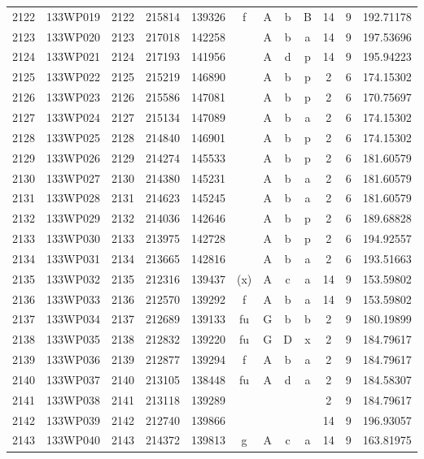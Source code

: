 \begin{tabular}{|*{12}{c|}}
2122 & 133WP019 & 2122 & 215814 & 139326 & f & A & b & B & 14 & 9 & 192.71178 \\ 
2123 & 133WP020 & 2123 & 217018 & 142258 &  & A & b & a & 14 & 9 & 197.53696 \\ 
2124 & 133WP021 & 2124 & 217193 & 141956 &  & A & d & p & 14 & 9 & 195.94223 \\ 
2125 & 133WP022 & 2125 & 215219 & 146890 &  & A & b & p & 2 & 6 & 174.15302 \\ 
2126 & 133WP023 & 2126 & 215586 & 147081 &  & A & b & p & 2 & 6 & 170.75697 \\ 
2127 & 133WP024 & 2127 & 215134 & 147089 &  & A & b & a & 2 & 6 & 174.15302 \\ 
2128 & 133WP025 & 2128 & 214840 & 146901 &  & A & b & p & 2 & 6 & 174.15302 \\ 
2129 & 133WP026 & 2129 & 214274 & 145533 &  & A & b & p & 2 & 6 & 181.60579 \\ 
2130 & 133WP027 & 2130 & 214380 & 145231 &  & A & b & a & 2 & 6 & 181.60579 \\ 
2131 & 133WP028 & 2131 & 214623 & 145245 &  & A & b & a & 2 & 6 & 181.60579 \\ 
2132 & 133WP029 & 2132 & 214036 & 142646 &  & A & b & p & 2 & 6 & 189.68828 \\ 
2133 & 133WP030 & 2133 & 213975 & 142728 &  & A & b & p & 2 & 6 & 194.92557 \\ 
2134 & 133WP031 & 2134 & 213665 & 142816 &  & A & b & a & 2 & 6 & 193.51663 \\ 
2135 & 133WP032 & 2135 & 212316 & 139437 & (x) & A & c & a & 14 & 9 & 153.59802 \\ 
2136 & 133WP033 & 2136 & 212570 & 139292 & f & A & b & a & 14 & 9 & 153.59802 \\ 
2137 & 133WP034 & 2137 & 212689 & 139133 & fu & G & b & b & 2 & 9 & 180.19899 \\ 
2138 & 133WP035 & 2138 & 212832 & 139220 & fu & G & D & x & 2 & 9 & 184.79617 \\ 
2139 & 133WP036 & 2139 & 212877 & 139294 & f & A & b & a & 2 & 9 & 184.79617 \\ 
2140 & 133WP037 & 2140 & 213105 & 138448 & fu & A & d & a & 2 & 9 & 184.58307 \\ 
2141 & 133WP038 & 2141 & 213118 & 139289 &  &  &  &  & 2 & 9 & 184.79617 \\ 
2142 & 133WP039 & 2142 & 212740 & 139866 &  &  &  &  & 14 & 9 & 196.93057 \\ 
2143 & 133WP040 & 2143 & 214372 & 139813 & g & A & c & a & 14 & 9 & 163.81975 \\ 

\end{tabular}
